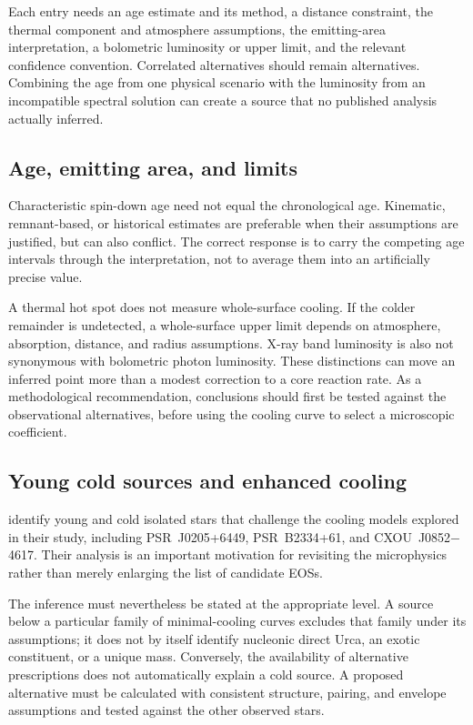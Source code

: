 \documentclass{aa}
\begin{document}
Each entry needs an age estimate and its method, a distance constraint, the thermal component and atmosphere assumptions, the emitting-area interpretation, a bolometric luminosity or upper limit, and the relevant confidence convention. Correlated alternatives should remain alternatives. Combining the age from one physical scenario with the luminosity from an incompatible spectral solution can create a source that no published analysis actually inferred.

\subsection{Age, emitting area, and limits}
Characteristic spin-down age need not equal the chronological age. Kinematic, remnant-based, or historical estimates are preferable when their assumptions are justified, but can also conflict. The correct response is to carry the competing age intervals through the interpretation, not to average them into an artificially precise value.

A thermal hot spot does not measure whole-surface cooling. If the colder remainder is undetected, a whole-surface upper limit depends on atmosphere, absorption, distance, and radius assumptions. X-ray band luminosity is also not synonymous with bolometric photon luminosity. These distinctions can move an inferred point more than a modest correction to a core reaction rate. As a methodological recommendation, conclusions should first be tested against the observational alternatives, before using the cooling curve to select a microscopic coefficient.

\subsection{Young cold sources and enhanced cooling}
\citet{Marino2024} identify young and cold isolated stars that challenge the cooling models explored in their study, including PSR~J0205+6449, PSR~B2334+61, and CXOU~J0852$-$4617. Their analysis is an important motivation for revisiting the microphysics rather than merely enlarging the list of candidate EOSs.

The inference must nevertheless be stated at the appropriate level. A source below a particular family of minimal-cooling curves excludes that family under its assumptions; it does not by itself identify nucleonic direct Urca, an exotic constituent, or a unique mass. Conversely, the availability of alternative prescriptions does not automatically explain a cold source. A proposed alternative must be calculated with consistent structure, pairing, and envelope assumptions and tested against the other observed stars.
\end{document}
